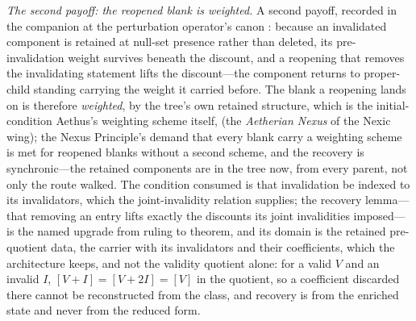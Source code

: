 \begin{defin}
\textit{The second payoff: the reopened blank is weighted.} A second payoff, recorded in the companion at the perturbation operator's canon \cite{Aethus}: because an invalidated component is retained at null-set presence rather than deleted, its pre-invalidation weight survives beneath the discount, and a reopening that removes the invalidating statement lifts the discount---the component returns to proper-child standing carrying the weight it carried before. The blank a reopening lands on is therefore \emph{weighted}, by the tree's own retained structure, which is the initial-condition Aethus's weighting scheme itself, (the \emph{Aetherian Nexus} of the Nexic wing); the Nexus Principle's demand that every blank carry a weighting scheme is met for reopened blanks without a second scheme, and the recovery is synchronic---the retained components are in the tree now, from every parent, not only the route walked. The condition consumed is that invalidation be indexed to its invalidators, which the joint-invalidity relation supplies; the recovery lemma---that removing an entry lifts exactly the discounts its joint invalidities imposed---is the named upgrade from ruling to theorem, and its domain is the retained pre-quotient data, the carrier with its invalidators and their coefficients, which the architecture keeps, and not the validity quotient alone: for a valid $V$ and an invalid $I$, $[V + I] = [V + 2I] = [V]$ in the quotient, so a coefficient discarded there cannot be reconstructed from the class, and recovery is from the enriched state and never from the reduced form.

\end{defin}
